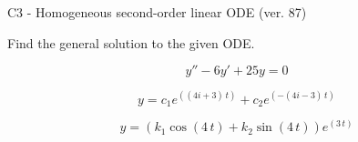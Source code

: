 \begin{exercise}
  \begin{exerciseTitle}C3 - Homogeneous second-order linear ODE (ver. 87)\end{exerciseTitle}
  \begin{exerciseStatement}
    
Find the general solution to the given ODE.

    
\[y''-6y'+25y = 0\]

  \end{exerciseStatement}
  \begin{exerciseAnswer}
    
\[y= c_{1} e^{\left(\left(4 i + 3\right) \, t\right)} + c_{2} e^{\left(-\left(4 i - 3\right) \, t\right)}\]

    
\[y= {\left(k_{1} \cos\left(4 \, t\right) + k_{2} \sin\left(4 \, t\right)\right)} e^{\left(3 \, t\right)}\]

  \end{exerciseAnswer}
\end{exercise}